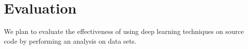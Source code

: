 \section{Evaluation}

We plan to evaluate the effectiveness of using deep learning techniques on source code by performing an analysis on data sets.

